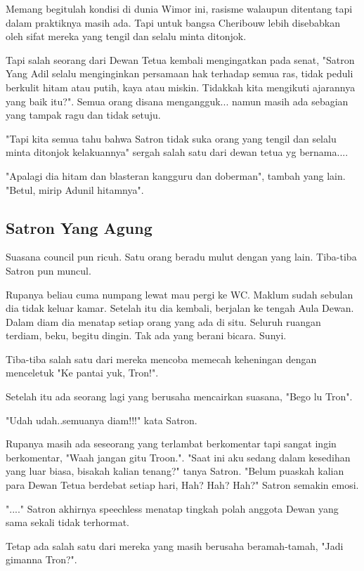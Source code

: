 \documentclass[a4paper,11pt,final]{article}
\begin{document}
Memang begitulah kondisi di dunia Wimor ini, rasisme walaupun 
ditentang tapi dalam praktiknya masih ada. 
Tapi untuk bangsa Cheribouw lebih disebabkan oleh sifat mereka 
yang tengil dan selalu minta ditonjok.

Tapi salah seorang dari Dewan Tetua kembali mengingatkan pada 
senat, "Satron Yang Adil selalu menginginkan persamaan hak terhadap 
semua ras, tidak peduli berkulit hitam atau putih, kaya atau miskin. 
Tidakkah kita mengikuti ajarannya yang baik itu?".
Semua orang disana mengangguk... namun masih ada sebagian yang 
tampak ragu dan tidak setuju.

"Tapi kita semua tahu bahwa Satron tidak suka orang yang tengil 
dan selalu minta ditonjok kelakuannya" sergah salah satu dari 
dewan tetua yg bernama....

"Apalagi dia hitam dan blasteran kangguru dan doberman", tambah 
yang lain. 
"Betul, mirip Adunil hitamnya". 

\subsection{Satron Yang Agung}
Suasana council pun ricuh. 
Satu orang beradu mulut dengan yang lain. 
Tiba-tiba Satron pun muncul.

Rupanya beliau cuma numpang lewat mau pergi ke WC. 
Maklum sudah sebulan dia tidak keluar kamar.
Setelah itu dia kembali, berjalan ke tengah Aula Dewan. 
Dalam diam dia menatap setiap orang yang ada di situ. 
Seluruh ruangan terdiam, beku, begitu dingin. 
Tak ada yang berani bicara. 
Sunyi.

Tiba-tiba salah satu dari mereka mencoba memecah keheningan dengan 
menceletuk "Ke pantai yuk, Tron!".

Setelah itu ada seorang lagi yang berusaha mencairkan suasana, 
"Bego lu Tron".

"Udah udah..semuanya diam!!!" kata Satron.

Rupanya masih ada seseorang yang terlambat berkomentar tapi sangat 
ingin berkomentar, "Waah jangan gitu Troon.".
"Saat ini aku sedang dalam kesedihan yang luar biasa, bisakah 
kalian tenang?" tanya Satron. 
"Belum puaskah kalian para Dewan Tetua berdebat setiap hari, 
Hah? Hah? Hah?" Satron semakin emosi.

"...." Satron akhirnya speechless menatap tingkah polah anggota 
Dewan yang sama sekali tidak terhormat.

Tetap ada salah satu dari mereka yang masih berusaha 
beramah-tamah, "Jadi gimanna Tron?".
\end{document}
